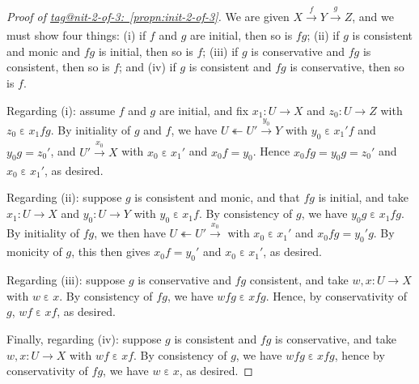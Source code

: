 \documentclass{amsart}
\makeatletter
\newcommand\ein{\mathrel{\varepsilon}}
\newcommand\oot{\twoheadleftarrow}
\newcommand\tox[2][]{\xrightarrow[#1]{#2}}
\newcommand\tagword[1]{\csname tag@#1\endcsname}
\def\label@tag#1:#2\@nil{#1}
\newcommand\labeltag[1]{\label@tag#1:\@nil}
\newcommand\jref[1]{%
  \texorpdfstring%
    {\hyperref[#1]{\tagword{\labeltag{#1}}~\ref*{#1}}}%
    {\tagword{\labeltag{#1}}~\ref*{#1}}%
}
\theoremstyle{definition}
\theoremstyle{remark}
\theoremstyle{plainwithref}
\makeatother
\begin{document}
\begin{proof}[Proof of \jref{propn:init-2-of-3}] \label{proof:init-2-of-3}
  We are given \( X \tox{f} Y \tox{g} Z \), and we must show four things: (i) if \( f \) and \( g \) are initial, then so is \( fg \); (ii) if \( g \) is consistent and monic and \( f g \) is initial, then so is \( f \); (iii) if \( g \) is conservative and \( f g \) is consistent, then so is \( f \); and (iv) if \( g \) is consistent and \( f g \) is conservative, then so is \( f \).

  Regarding (i): assume \( f \) and \( g \) are initial, and fix \( x_1 \colon U \to X \) and \( z_0 \colon U \to Z \) with \( z_0 \ein x_1 f g \).
  By initiality of \( g \) and \( f \), we have \( U \oot U' \tox{y_0} Y \) with \( y_0 \ein x_1' f \) and \( y_0 g = z_0' \), and \( U' \tox{x_0} X \) with \( x_0 \ein x_1' \) and \( x_0 f = y_0 \).
  Hence \( x_0 f g = y_0 g = z_0' \) and \( x_0 \ein x_1' \), as desired.

  Regarding (ii): suppose \( g \) is consistent and monic, and that \( f g \) is initial, and take \( x_1 \colon U \to X \) and \( y_0 \colon U \to Y \) with \( y_0 \ein x_1 f \).
  By consistency of \( g \), we have \( y_0 g \ein x_1 f g \).
  By initiality of \( f g \), we then have \( U \oot U' \tox{x_0} \) with \( x_0 \ein x_1' \) and \( x_0 f g = y_0' g \).
  By monicity of \( g \), this then gives \( x_0 f = y_0' \) and \( x_0 \ein x_1' \), as desired.

  Regarding (iii): suppose \( g \) is conservative and \( f g \) consistent, and take \( w,x \colon U \to X \) with \( w \ein x \).
  By consistency of \( f g \), we have \( w f g \ein x f g \).
  Hence, by conservativity of \( g \), \( w f \ein x f \), as desired.

  Finally, regarding (iv): suppose \( g \) is consistent and \( f g \) is conservative, and take \( w,x \colon U \to X \) with \( w f \ein x f \).
  By consistency of \( g \), we have \( w f g \ein x f g \), hence by conservativity of \( f g \), we have \( w \ein x \), as desired.
\end{proof}
\end{document}
